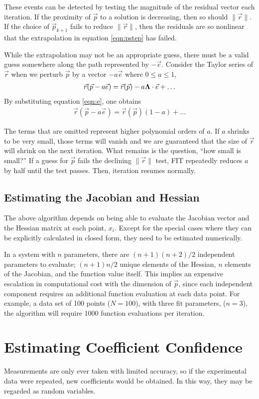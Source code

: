 \documentclass{article}
\def\p{\vec{p}}
\def\r{\vec{r}}
\def\LAM{{\bf \Lambda}}
\begin{document}
These events can be detected by testing the magnitude of the residual vector each iteration.  If the proximity of $\p$ to a solution is decreasing, then so should $\|\r\|$.  If the choice of $\p_{k+1}$ fails to reduce $\|\r\|$, then the residuals are so nonlinear that the extrapolation in equation \ref{eqn:pstep} has failed.

While the extrapolation may not be an appropriate guess, there must be a valid guess somewhere along the path represented by $-\vec{e}$.  Consider the Taylor series of $\r$ when we perturb $\p$ by a vector $-a\vec{e}$ where $0\le a\le 1$,
\begin{align}
\r(\p-a\vec{e}) = \r(\p) - a \LAM \cdot \vec{e} + \ldots
\end{align}
By substituting equation \ref{eqn:e}, one obtains
\begin{align}
\r(\p-a\vec{e}) = \r(\p) (1-a) + \ldots
\end{align}

The terms that are omitted represent higher polynomial orders of $a$.  If $a$ shrinks to be very small, those terms will vanish and we are guaranteed that the size of $\r$ will shrink on the next iteration.  What remains is the question, ``how small is small?''  If a guess for $\p$ fails the declining $\|\r\|$ test, FIT repeatedly reduces $a$ by half until the test passes.  Then, iteration resumes normally.

\subsection{Estimating the Jacobian and Hessian}
The above algorithm depends on being able to evaluate the Jacobian vector and the Hessian matrix at each point, $x_i$.  Except for the special cases where they can be explicitly calculated in closed form, they need to be estimated numerically.

In a system with $n$ parameters, there are $(n+1)(n+2)/2$ independent parameters to evaluate; $(n+1)n/2$ unique elements of the Hessian, $n$ elements of the Jacobian, and the function value itself.  This implies an expensive escalation in computational cost with the dimension of $\p$, since each independent component requires an additional function evaluation at each data point.  For example, a data set of 100 points ($N=100$), with three fit parameters, ($n=3$), the algorithm will require 1000 function evaluations per iteration.

\section{Estimating Coefficient Confidence}
Measurements are only ever taken with limited accuracy, so if the experimental data were repeated, new coefficients would be obtained.  In this way, they may be regarded as random variables.
\end{document}
